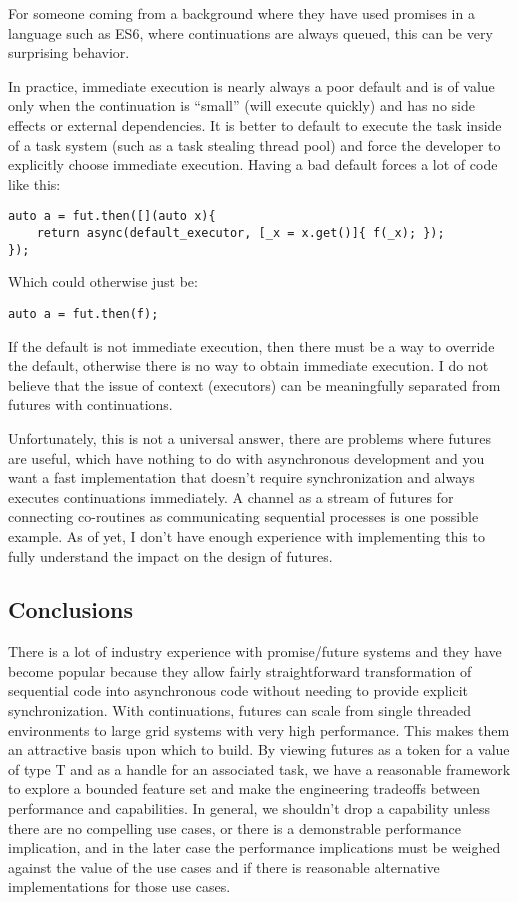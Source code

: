 For someone coming from a background where they have used promises in a language such as ES6, where continuations are always queued, this can be very surprising behavior.

In practice, immediate execution is nearly always a poor default and is of value only when the continuation is “small” (will execute quickly) and has no side effects or external dependencies. It is better to default to execute the task inside of a task system (such as a task stealing thread pool) and force the developer to explicitly choose immediate execution. Having a bad default forces a lot of code like this:

\begin{verbatim}
auto a = fut.then([](auto x){
    return async(default_executor, [_x = x.get()]{ f(_x); });
});
\end{verbatim}

Which could otherwise just be:

\begin{verbatim}
auto a = fut.then(f);
\end{verbatim}

If the default is not immediate execution, then there must be a way to override the default, otherwise there is no way to obtain immediate execution.
I do not believe that the issue of context (executors) can be meaningfully separated from futures with continuations.

Unfortunately, this is not a universal answer, there are problems where futures are useful, which have nothing to do with asynchronous development and you want a fast implementation that doesn’t require synchronization and always executes continuations immediately. A channel as a stream of futures for connecting co-routines as communicating sequential processes is one possible example. As of yet, I don’t have enough experience with implementing this to fully understand the impact on the design of futures.

\subsection{Conclusions}

There is a lot of industry experience with promise/future systems and they have become popular because they allow fairly straightforward transformation of sequential code into asynchronous code without needing to provide explicit synchronization. With continuations, futures can scale from single threaded environments to large grid systems with very high performance. This makes them an attractive basis upon which to build. By viewing futures as a token for a value of type T and as a handle for an associated task, we have a reasonable framework to explore a bounded feature set and make the engineering tradeoffs between performance and capabilities. In general, we shouldn’t drop a capability unless there are no compelling use cases, or there is a demonstrable performance implication, and in the later case the performance implications must be weighed against the value of the use cases and if there is reasonable alternative implementations for those use cases.
